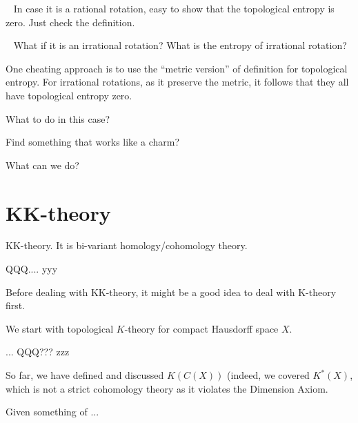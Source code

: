\documentclass[a5paper]{article}
\begin{document}
	
   In case it is a rational rotation, easy to show that the topological entropy is zero. Just check the definition.
   
   What if it is an irrational rotation? What is the entropy of irrational rotation? %
   
   One cheating approach is to use the ``metric version'' of definition for topological entropy. For irrational rotations, as it preserve the metric, it follows that they all have topological entropy zero.
  
What to do in this case?


    Find something that works like a charm?
    
    What can we do?
    
  	
    
\section{KK-theory}

KK-theory. It is bi-variant homology/cohomology theory.

QQQ....  yyy

Before dealing with KK-theory, it might be a good idea to deal with K-theory first.

We start with topological $K$-theory for compact Hausdorff space $X$. 

... QQQ??? zzz

So far, we have defined and discussed $K( C(X) )$ (indeed, we covered $K^*(X)$, which is not a strict cohomology theory as it violates the Dimension Axiom.

Given something of ...






    
    
   
   

   
   
   
\end{document}
